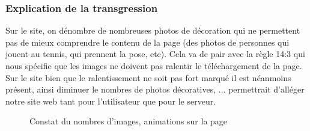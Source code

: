 \documentclass{article}[12pt]
\begin{document}
    	    \subsubsection*{Explication de la transgression}
    	       Sur le site, on dénombre de nombreuses photos de décoration qui ne permettent pas de mieux comprendre le contenu de la page (des photos de personnes qui jouent au tennis, qui prennent la pose, etc). Cela va de pair avec la règle 14:3 qui nous spécifie que les images ne doivent pas ralentir le téléchargement de la page. Sur le site bien que le ralentissement ne soit pas fort marqué il est néanmoins présent, ainsi diminuer le nombres de photos décoratives, ... permettrait d'alléger notre site web tant pour l'utilisateur que pour le serveur. 
    	       \begin{figure}[H]
   	\centering
   	\caption{Constat du nombres d'images, animations sur la page}
   \end{figure}
\end{document}

